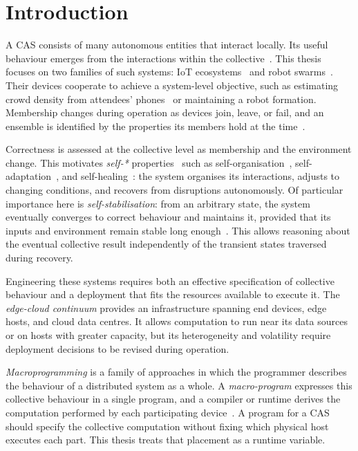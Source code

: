 \chapter{Introduction}
\label{chap:introduction}

A \ac{CAS} consists of many autonomous entities that interact locally.
Its useful behaviour emerges from the interactions within the collective~\cite{DBLP:journals/sttt/NicolaJW20}.
%
This thesis focuses on two families of such systems:
\ac{IoT} ecosystems~\cite{DBLP:journals/cn/AtzoriIM10} and robot swarms~\cite{DBLP:journals/swarm/BrambillaFBD13}.
Their devices cooperate to achieve a system-level objective,
such as estimating crowd density from attendees' phones~\cite{DBLP:journals/computer/BealPV15}
or maintaining a robot formation.
%
Membership changes during operation as devices join, leave, or fail,
and an ensemble is identified by the properties its members hold at the time~\cite{DBLP:journals/taas/NicolaLPT14}.

Correctness is assessed at the collective level as membership and the environment change.
%
This motivates \emph{self-*} properties~\cite{DBLP:journals/computer/KephartC03}
such as self-organi\-sation~\cite{DBLP:conf/atal/WolfH04},
self-adaptation~\cite{DBLP:conf/dagstuhl/ChengLGIMABBBCSDFGGGKKKLMMMPSTTWW09},
and self-healing~\cite{DBLP:journals/computer/KephartC03}:
the system organises its interactions, adjusts to changing conditions, and recovers from disruptions autonomously.
%
Of particular importance here is \emph{self-stabilisation}:
from an arbitrary state, the system eventually converges to correct behaviour and maintains it,
provided that its inputs and environment remain stable long enough~\cite{DBLP:journals/tomacs/ViroliABDP18}.
%
This allows reasoning about the eventual collective result independently of the transient states traversed during recovery.

Engineering these systems requires both an effective specification of collective behaviour
and a deployment that fits the resources available to execute it.
%
The \emph{edge-cloud continuum} provides an infrastructure spanning end devices, edge hosts, and cloud data centres.
It allows computation to run near its data sources or on hosts with greater capacity,
but its heterogeneity and volatility require deployment decisions to be revised during operation.

\emph{Macroprogramming} is a family of approaches in which the programmer describes the behaviour of a distributed system as a whole.
A \emph{macro-program} expresses this collective behaviour in a single program,
and a compiler or runtime derives the computation performed by each participating device~\cite{DBLP:journals/csur/Casadei23}.
%
A program for a \ac{CAS} should specify the collective computation without fixing which physical host executes each part.
This thesis treats that placement as a runtime variable.


